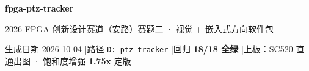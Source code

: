 \documentclass[10pt]{ctexart}
\begin{document}
\begin{tcolorbox}[enhanced, colback=deep, colframe=deep, arc=2.5mm,
  left=5mm, right=5mm, top=3.2mm, bottom=3.2mm, boxrule=0pt]
  {\color{white}\LARGE\bfseries fpga-ptz-tracker }\par
  \vspace{1mm}
  {\color{white!85!deep}2026 FPGA 创新设计赛道（安路）赛题二 \;·\; 视觉 + 嵌入式方向软件包}\par
  \vspace{2mm}
  {\color{white!70!deep}\small 生成日期 2026-10-04 \quad|\quad 路径 \texttt{D:\string\fpga-ptz-tracker}
   \quad|\quad 回归 \textbf{18/18 全绿} \quad|\quad 上板：SC520 直通出图 · 饱和度增强 \textbf{1.75x} 定版}
\end{tcolorbox}

\vspace{3.5mm}
\end{document}
